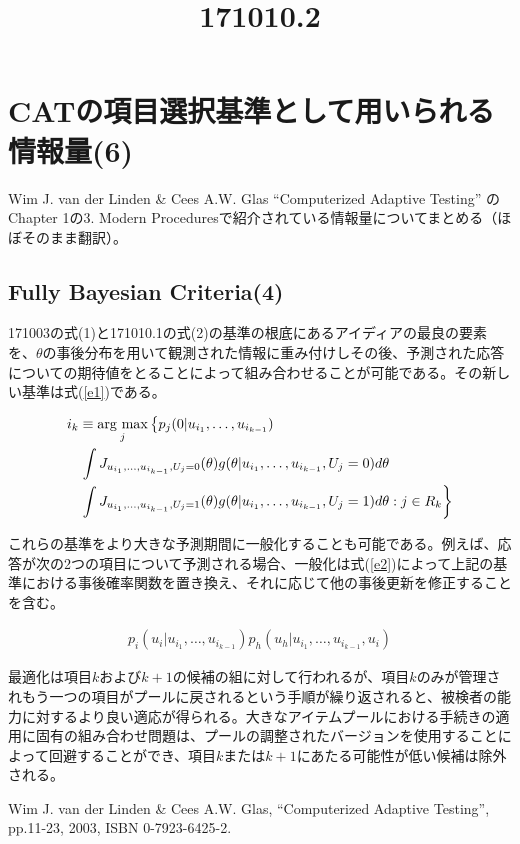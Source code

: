 \documentclass[a4j]{jarticle}
\date{}
\title{171010.2}
\begin{document}
\maketitle

\section{CATの項目選択基準として用いられる情報量(6)}
Wim J. van der Linden \& Cees A.W. Glas ``Computerized Adaptive Testing'' \cite{b1}のChapter 1の3. Modern Proceduresで紹介されている情報量についてまとめる（ほぼそのまま翻訳）。

\subsection{Fully Bayesian Criteria(4)}
171003の式(1)と171010.1の式(2)の基準の根底にあるアイディアの最良の要素を、$\theta$の事後分布を用いて観測された情報に重み付けしその後、予測された応答についての期待値をとることによって組み合わせることが可能である。その新しい基準は式(\ref{e1})である。

\newcommand{\argmax}{\mathop{\rm arg~max}\limits}
\begin{eqnarray}
\begin{split}
  \label{e1}
  i_{k} &\equiv \argmax_{j}\left\{p_{j}(0|u_{i_{1}},\ldots,u_{i_{k-1}})\right.\\
  &\left.\int J_{u_{i_{1}},\ldots,u_{i_{k-1}},U_{j}=0}(\theta)g(\theta|u_{i_{1}},\ldots,u_{i_{k-1}},U_{j}=0)d\theta\right.\\
  &\left.\int J_{u_{i_{1}},\ldots,u_{i_{k-1}},U_{j}=1}(\theta)g(\theta|u_{i_{1}},\ldots,u_{i_{k-1}},U_{j}=1)d\theta:j\in R_{k}\right\}
\end{split}
\end{eqnarray}

これらの基準をより大きな予測期間に一般化することも可能である。例えば、応答が次の2つの項目について予測される場合、一般化は式(\ref{e2})によって上記の基準における事後確率関数を置き換え、それに応じて他の事後更新を修正することを含む。

\begin{eqnarray}
  \label{e2}
  p_{i}(u_{i}|u_{i_{1}},\ldots,u_{i_{k-1}})p_{h}(u_{h}|u_{i_{1}},\ldots,u_{i_{k-1}},u_{i})
\end{eqnarray}

最適化は項目$k$および$k+1$の候補の組に対して行われるが、項目$k$のみが管理されもう一つの項目がプールに戻されるという手順が繰り返されると、被検者の能力に対するより良い適応が得られる。大きなアイテムプールにおける手続きの適用に固有の組み合わせ問題は、プールの調整されたバージョンを使用することによって回避することができ、項目$k$または$k+1$にあたる可能性が低い候補は除外される。

\begin{thebibliography}{9}
   Wim J. van der Linden \& Cees A.W. Glas, ``Computerized Adaptive Testing'', pp.11-23, 2003, ISBN 0-7923-6425-2.
\end{thebibliography}
\end{document}
